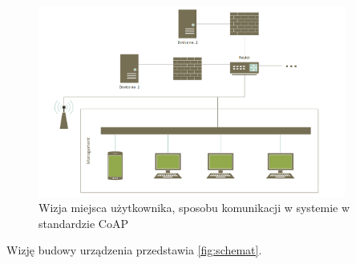 \begin{figure}[!htbp]
	\centering
	\includegraphics[width=0.9\textwidth]{images/schemat.png}
	\caption[Wizja architektury systemu w standardzie CoAP.]{Wizja miejsca użytkownika, sposobu komunikacji w systemie w standardzie CoAP}
	\label{fig:schemat}
\end{figure}
Wizję budowy urządzenia przedstawia \autoref{fig:schemat}.